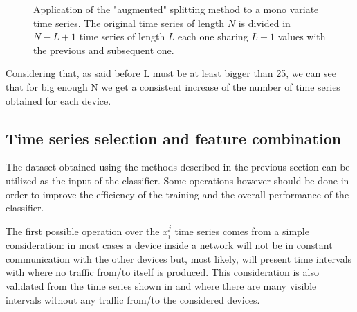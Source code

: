 \begin{figure}[h]
\vspace{-7mm}
    \centering

\caption{Application of the "augmented" splitting method to a mono variate time series. The original time series of length $N$ is divided in $N-L+1$ time series of length $L$ each one sharing $L-1$ values with the previous and subsequent one.}
    \label{fig:ts_split_aug}
    \vspace{-10mm}
\end{figure}
\newpage
Considering that, as said before L must be at least bigger than 25, we can see that for big enough N we get a consistent increase of the number of time series obtained for each device. 

%
%


\subsection{Time series selection and feature combination}

The dataset obtained using the methods described in the previous section can be utilized as the input of the classifier. Some operations however should be done in order to improve the efficiency of the training and the overall performance of the classifier.

The first possible operation over the $\bar{x}_i^j$ time series comes from a simple consideration: in most cases a device inside a network will not be in constant communication with the other devices but, most likely, will present time intervals with where no traffic from/to itself is produced. This consideration is also validated from the time series shown in  and  where there are many visible intervals without any traffic from/to the considered devices.

